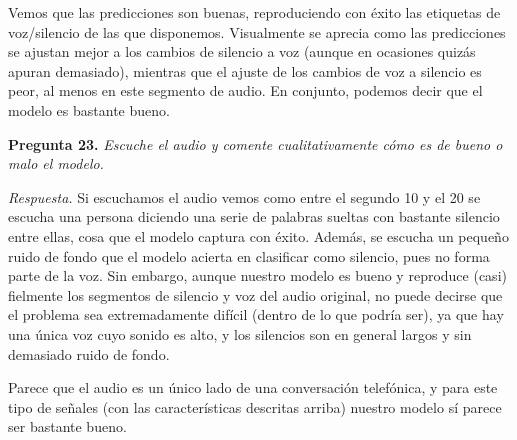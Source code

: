 \documentclass[11pt]{article}
\begin{document}
Vemos que las predicciones son buenas, reproduciendo con éxito las etiquetas de voz/silencio de las que disponemos. Visualmente se aprecia como las predicciones se ajustan mejor a los cambios de silencio a voz (aunque en ocasiones quizás apuran demasiado), mientras que el ajuste de los cambios de voz a silencio es peor, al menos en este segmento de audio. En conjunto, podemos decir que el modelo es bastante bueno.

\textbf{Pregunta 23.} \textit{Escuche el audio y comente cualitativamente cómo es de bueno o malo el modelo.}

\textit{Respuesta.} Si escuchamos el audio vemos como entre el segundo 10 y el 20 se escucha una persona diciendo una serie de palabras sueltas con bastante silencio entre ellas, cosa que el modelo captura con éxito. Además, se escucha un pequeño ruido de fondo que el modelo acierta en clasificar como silencio, pues no forma parte de la voz. Sin embargo, aunque nuestro modelo es bueno y reproduce (casi) fielmente los segmentos de silencio y voz del audio original, no puede decirse que el problema sea extremadamente difícil (dentro de lo que podría ser), ya que hay una única voz cuyo sonido es alto, y los silencios son en general largos y sin demasiado ruido de fondo.

Parece que el audio es un único lado de una conversación telefónica, y para este tipo de señales (con las características descritas arriba) nuestro modelo sí parece ser bastante bueno.
\end{document}
